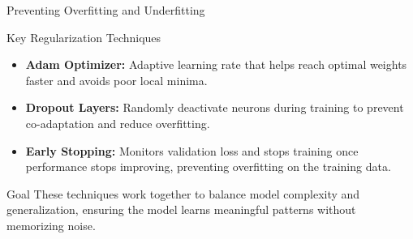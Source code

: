 \begin{frame}[label=regularization, shrink]{Preventing Overfitting and Underfitting}

\begin{block}{Key Regularization Techniques}
    \begin{itemize}
        \item \textbf{Adam Optimizer:} Adaptive learning rate that helps reach optimal weights faster and avoids poor local minima.
        \item \textbf{Dropout Layers:} Randomly deactivate neurons during training to prevent co-adaptation and reduce overfitting.
        \item \textbf{Early Stopping:} Monitors validation loss and stops training once performance stops improving, preventing overfitting on the training data.
    \end{itemize}
\end{block}

\begin{alertblock}{Goal}
    These techniques work together to balance model complexity and generalization, ensuring the model learns meaningful patterns without memorizing noise.
\end{alertblock}

\end{frame}

